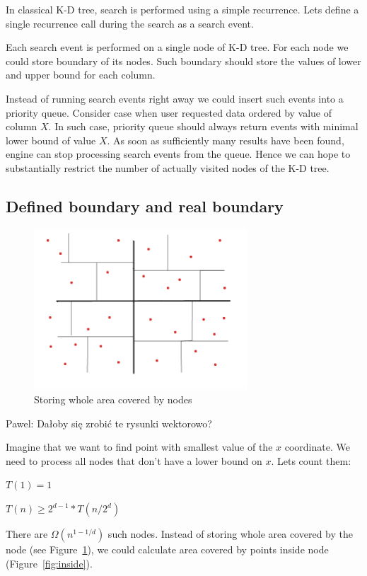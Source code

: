 \documentclass[10pt,a4paper]{article}
\newcommand{\pawel}[1]{\noindent\colorbox{myRed}{Pawel: #1}}
\begin{document}
In classical K-D tree, search is performed using a simple recurrence. Lets define a single recurrence call during the search as a search event.

Each search event is performed on a single node of K-D tree. For each node we could store boundary of its nodes. Such boundary should store the values of lower and upper bound for each column.

Instead of running search events right away we could insert such events into a priority queue. Consider case when user requested data ordered by value of column $X$. In such case, priority queue should always return events with minimal lower bound of value $X$. As soon as sufficiently many results have been found, engine can stop processing search events from the queue. Hence we can hope to substantially restrict the number of actually visited nodes of the K-D tree.

\subsection{Defined boundary and real boundary}

\begin{figure}
\centering
  \includegraphics[width=8cm]{simple_boundary.png}%
  \caption{Storing whole area covered by nodes}
  \label{fig:covered}
\end{figure}
\pawel{Dałoby się zrobić te rysunki wektorowo?}

Imagine that we want to find point with smallest value of the $x$ coordinate. We need to process all nodes
that don't have a lower bound on $x$. Lets count them:
\bigskip

$T(1) = 1$

$T(n) \geq 2^{d-1} * T(n/2^{d})$

\bigskip

There are $\Omega (n^{1-1/d})$ such nodes. Instead of storing whole area covered by the node (see Figure~\ref{fig:covered}), we could calculate area covered by points inside node (Figure~\ref{fig:inside}).
\end{document}
